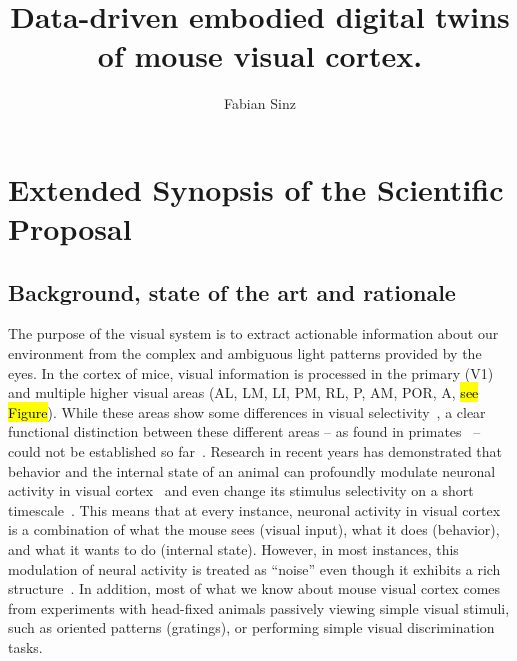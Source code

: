 \documentclass[COG,11pt]{ercgrant}
\author{Fabian Sinz}
\title{Data-driven embodied digital twins of mouse visual cortex.}
\begin{document}
\maketitle

\begin{abstract}
	\textcolor{red}{
		
	}
\end{abstract}



\section{Extended Synopsis of the Scientific Proposal}

\subsection{Background, state of the art and rationale}
The purpose of the visual system is to extract actionable information about our environment from the complex and ambiguous light patterns provided by the eyes. 
In the cortex of mice, visual information is processed in the primary (V1) and multiple higher visual areas (AL, LM, LI, PM, RL, P, AM, POR, A, \hl{see Figure}).
While these areas show some differences in visual selectivity~\parencite{Glickfeld2017-fk}, a clear functional distinction between these different areas -- as found in primates~\parencite{Guclu2015-hv,Yamins2016-ob,Guclu2017-bi,Cadena2022-im} -- could not be established so far~\parencite{Conwell2021-pw}.
Research in recent years has demonstrated that behavior and the internal state of an animal can profoundly modulate neuronal activity in visual cortex~\parencite{Niell2010-bs,Musall2019-kd,Stringer2019-lt} and even change its stimulus selectivity on a short timescale~\parencite{Franke2022-do}.
This means that at every instance, neuronal activity in visual cortex is a combination of what the mouse sees (visual input), what it does (behavior), and what it wants to do (internal state). 
However, in most instances, this modulation of neural activity is treated as ``noise'' even though it exhibits a rich structure~\parencite{Musall2019-kd, Stringer2019-lt}.
In addition, most of what we know about mouse visual cortex comes from experiments with head-fixed animals passively viewing simple visual stimuli, such as oriented patterns (gratings), or performing simple visual discrimination tasks. 
\end{document}
